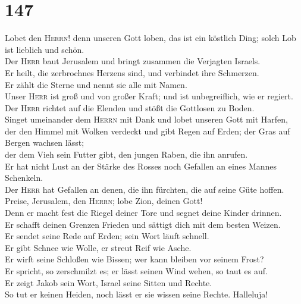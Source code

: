 \hypertarget{section-146}{%
\section{147}\label{section-146}}

 Lobet den \textsc{Herrn}! denn unseren Gott loben, das
ist ein köstlich Ding; solch Lob ist lieblich und schön.\\
 Der \textsc{Herr} baut Jerusalem und bringt zusammen die
Verjagten Israels.\\
 Er heilt, die zerbrochnes Herzens sind, und verbindet
ihre Schmerzen.\\
 Er zählt die Sterne und nennt sie alle mit Namen.\\
 Unser \textsc{Herr} ist groß und von großer Kraft; und
ist unbegreiflich, wie er regiert.\\
 Der \textsc{Herr} richtet auf die Elenden und stößt die
Gottlosen zu Boden.\\
 Singet umeinander dem \textsc{Herrn} mit Dank und lobet
unseren Gott mit Harfen,\\
 der den Himmel mit Wolken verdeckt und gibt Regen auf
Erden; der Gras auf Bergen wachsen lässt;\\
 der dem Vieh sein Futter gibt, den jungen Raben, die ihn
anrufen.\\
 Er hat nicht Lust an der Stärke des Rosses noch Gefallen
an eines Mannes Schenkeln.\\
 Der \textsc{Herr} hat Gefallen an denen, die ihn
fürchten, die auf seine Güte hoffen.\\
 Preise, Jerusalem, den \textsc{Herrn}; lobe Zion, deinen
Gott!\\
 Denn er macht fest die Riegel deiner Tore und segnet
deine Kinder drinnen.\\
 Er schafft deinen Grenzen Frieden und sättigt dich mit
dem besten Weizen.\\
 Er sendet seine Rede auf Erden; sein Wort läuft
schnell.\\
 Er gibt Schnee wie Wolle, er streut Reif wie Asche.\\
 Er wirft seine Schloßen wie Bissen; wer kann bleiben vor
seinem Frost?\\
 Er spricht, so zerschmilzt es; er lässt seinen Wind
wehen, so taut es auf.\\
 Er zeigt Jakob sein Wort, Israel seine Sitten und
Rechte.\\
 So tut er keinen Heiden, noch lässt er sie wissen seine
Rechte. Halleluja!

